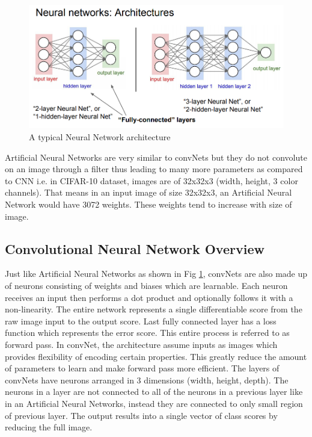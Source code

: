 \documentclass[11pt]{article}
\begin{document}
\begin{figure}[H]
	\includegraphics[width=\linewidth]{files/NN.jpeg}
	\caption{A typical Neural Network architecture}
	\label{fig: Neural Network architecture}
\end{figure}

Artificial Neural Networks are very similar to convNets but they do not convolute on an image through a filter thus leading to many more parameters as compared to CNN i.e. in CIFAR-10 dataset, images are of 32x32x3 (width, height, 3 color channels). That means in an input image of size 32x32x3, an Artificial Neural Network would have 3072 weights. These weights tend to increase with size of image.

\subsection{Convolutional Neural Network Overview}
Just like Artificial Neural Networks as shown in Fig \ref{fig: Neural Network architecture}, convNets are also made up of neurons consisting of weights and biases which are learnable. Each neuron receives an input then performs a dot product and optionally follows it with a non-linearity. The entire network represents a single differentiable score from the raw image input to the output score. Last fully connected layer has a loss function which represents the error score. This entire process is referred to as forward pass. In convNet, the architecture assume inputs as images which provides flexibility of encoding certain properties. This greatly reduce the amount of parameters to learn and make forward pass more efficient. The layers of convNets have neurons arranged in 3 dimensions (width, height, depth). The neurons in a layer are not connected to all of the neurons in a previous layer like in an Artificial Neural Networks, instead they are connected to only small region of previous layer. The output results into a single vector of class scores by reducing the full image.
\end{document}
